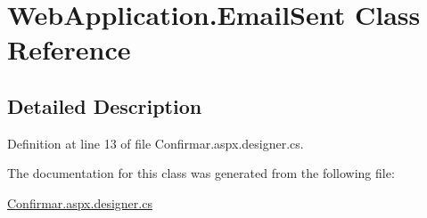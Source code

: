 \hypertarget{classWebApplication_1_1EmailSent}{}\section{Web\+Application.\+Email\+Sent Class Reference}
\label{classWebApplication_1_1EmailSent}


\subsection{Detailed Description}


Definition at line 13 of file Confirmar.\+aspx.\+designer.\+cs.



The documentation for this class was generated from the following file\+:\begin{DoxyCompactItemize}
\item 
\mbox{\hyperlink{Confirmar_8aspx_8designer_8cs}{Confirmar.\+aspx.\+designer.\+cs}}\end{DoxyCompactItemize}
